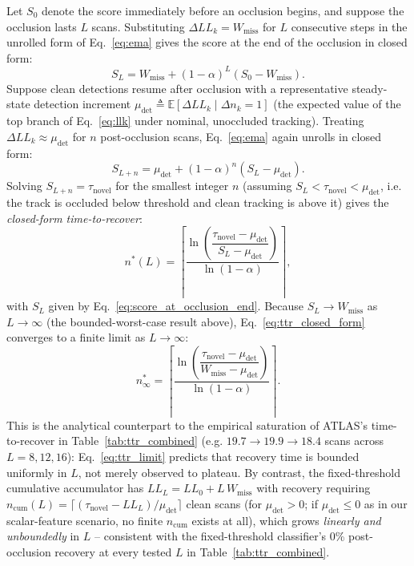 \documentclass[conference]{IEEEtran}
\begin{document}
Let $S_0$ denote the score immediately before an occlusion begins, and suppose the occlusion lasts $L$ scans. Substituting $\Delta LL_k = W_{\text{miss}}$ for $L$ consecutive steps in the unrolled form of Eq.~\eqref{eq:ema} gives the score at the end of the occlusion in closed form:
\begin{equation}
S_L = W_{\text{miss}} + (1-\alpha)^L \left(S_0 - W_{\text{miss}}\right).
\label{eq:score_at_occlusion_end}
\end{equation}
Suppose clean detections resume after occlusion with a representative steady-state detection increment $\mu_{\text{det}} \triangleq \mathbb{E}[\Delta LL_k \mid \Delta n_k = 1]$ (the expected value of the top branch of Eq.~\eqref{eq:llk} under nominal, unoccluded tracking). Treating $\Delta LL_k \approx \mu_{\text{det}}$ for $n$ post-occlusion scans, Eq.~\eqref{eq:ema} again unrolls in closed form:
\begin{equation}
S_{L+n} = \mu_{\text{det}} + (1-\alpha)^n \left(S_L - \mu_{\text{det}}\right).
\end{equation}
Solving $S_{L+n} = \tau_{\text{novel}}$ for the smallest integer $n$ (assuming $S_L < \tau_{\text{novel}} < \mu_{\text{det}}$, i.e. the track is occluded below threshold and clean tracking is above it) gives the \emph{closed-form time-to-recover}:
\begin{equation}
n^\ast(L) = \left\lceil \frac{\ln\!\left(\dfrac{\tau_{\text{novel}} - \mu_{\text{det}}}{S_L - \mu_{\text{det}}}\right)}{\ln(1-\alpha)} \right\rceil,
\label{eq:ttr_closed_form}
\end{equation}
with $S_L$ given by Eq.~\eqref{eq:score_at_occlusion_end}. Because $S_L \to W_{\text{miss}}$ as $L \to \infty$ (the bounded-worst-case result above), Eq.~\eqref{eq:ttr_closed_form} converges to a finite limit as $L \to \infty$:
\begin{equation}
n^\ast_\infty = \left\lceil \frac{\ln\!\left(\dfrac{\tau_{\text{novel}} - \mu_{\text{det}}}{W_{\text{miss}} - \mu_{\text{det}}}\right)}{\ln(1-\alpha)} \right\rceil.
\label{eq:ttr_limit}
\end{equation}
This is the analytical counterpart to the empirical saturation of ATLAS's time-to-recover in Table~\ref{tab:ttr_combined} (e.g. $19.7 \to 19.9 \to 18.4$ scans across $L = 8,12,16$): Eq.~\eqref{eq:ttr_limit} predicts that recovery time is bounded uniformly in $L$, not merely observed to plateau. By contrast, the fixed-threshold cumulative accumulator has $LL_L = LL_0 + L\,W_{\text{miss}}$ with recovery requiring $n_{\text{cum}}(L) = \lceil (\tau_{\text{novel}} - LL_L)/\mu_{\text{det}} \rceil$ clean scans (for $\mu_{\text{det}} > 0$; if $\mu_{\text{det}} \le 0$ as in our scalar-feature scenario, no finite $n_{\text{cum}}$ exists at all), which grows \emph{linearly and unboundedly} in $L$ -- consistent with the fixed-threshold classifier's 0\% post-occlusion recovery at every tested $L$ in Table~\ref{tab:ttr_combined}.
\end{document}
